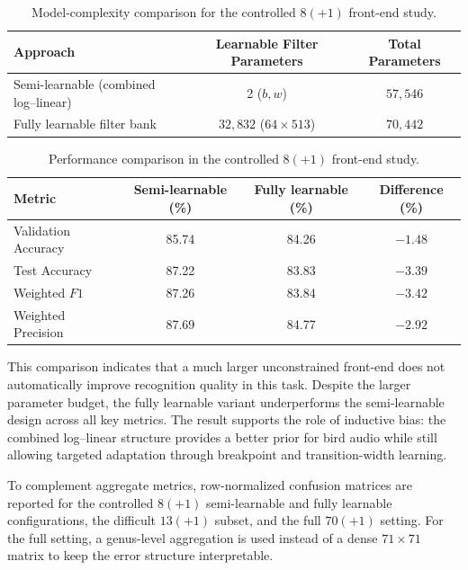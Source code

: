 \documentclass[a4paper,singleside,12pt]{report} %
\begin{document}
	\begin{table}[H]
		\centering
		\scriptsize
		\renewcommand{\arraystretch}{1.15}
		\setlength{\tabcolsep}{6pt}
		\caption{Model-complexity comparison for the controlled \(8(+1)\) front-end study.}
		\label{tab:semi_vs_fully_complexity}
		\begin{tabular}{|p{}|c|c|}
			\hline
			Approach & Learnable Filter Parameters & Total Parameters \\
			\hline
			Semi-learnable (combined log--linear) & 2 (\(b, w\)) & \(57{,}546\) \\
			\hline
			Fully learnable filter bank & \(32{,}832\) (\(64\times 513\)) & \(70{,}442\) \\
			\hline
		\end{tabular}
	\end{table}

	\begin{table}[H]
		\centering
		\scriptsize
		\renewcommand{\arraystretch}{1.15}
		\setlength{\tabcolsep}{6pt}
		\caption{Performance comparison in the controlled \(8(+1)\) front-end study.}
		\label{tab:semi_vs_fully_metrics}
		\begin{tabular}{|p{}|c|c|c|}
			\hline
			Metric & Semi-learnable (\%) & Fully learnable (\%) & Difference (\%) \\
			\hline
			Validation Accuracy & 85.74 & 84.26 & \(-1.48\) \\
			\hline
			Test Accuracy & 87.22 & 83.83 & \(-3.39\) \\
			\hline
			Weighted \(F1\) & 87.26 & 83.84 & \(-3.42\) \\
			\hline
			Weighted Precision & 87.69 & 84.77 & \(-2.92\) \\
			\hline
		\end{tabular}
	\end{table}

		\begin{sloppypar}
		This comparison indicates that a much larger unconstrained front-end does not automatically improve recognition quality in this task. Despite the larger parameter budget, the fully learnable variant underperforms the semi-learnable design across all key metrics. The result supports the role of inductive bias: the combined log--linear structure provides a better prior for bird audio while still allowing targeted adaptation through breakpoint and transition-width learning.
		\end{sloppypar}


	To complement aggregate metrics, row-normalized confusion matrices are reported for the controlled \(8(+1)\) semi-learnable and fully learnable configurations, the difficult \(13(+1)\) subset, and the full \(70(+1)\) setting. For the full setting, a genus-level aggregation is used instead of a dense \(71\times71\) matrix to keep the error structure interpretable.
\end{document}
